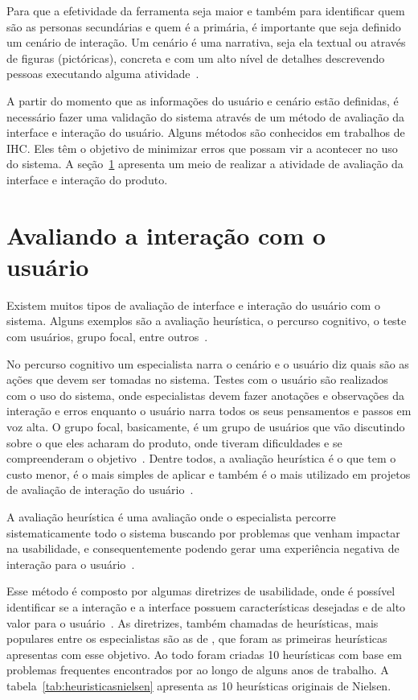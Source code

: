 Para que a efetividade da ferramenta seja maior e também para identificar quem são as personas secundárias e quem é a primária, é importante que seja definido um cenário de interação. Um cenário é uma narrativa, seja ela textual ou através de figuras (pictóricas), concreta e com um alto nível de detalhes descrevendo pessoas executando alguma atividade~\cite{barbosa:2010}.

A partir do momento que as informações do usuário e cenário estão definidas, é necessário fazer uma validação do sistema através de um método de avaliação da interface e interação do usuário. Alguns métodos são conhecidos em trabalhos de IHC. Eles têm o objetivo de minimizar erros que possam vir a acontecer no uso do sistema. A seção~\ref{sec:avaliacao} apresenta um meio de realizar a atividade de avaliação da interface e interação do produto.

\section{Avaliando a interação com o usuário}
\label{sec:avaliacao}
Existem muitos tipos de avaliação de interface e interação do usuário com o sistema. Alguns exemplos são a avaliação heurística, o percurso cognitivo, o teste com usuários, grupo focal, entre outros~\cite{barbosa:2010}.

No percurso cognitivo um especialista narra o cenário e o usuário diz quais são as ações que devem ser tomadas no sistema. Testes com o usuário são realizados com o uso do sistema, onde especialistas devem fazer anotações e observações da interação e erros enquanto o usuário narra todos os seus pensamentos e passos em voz alta. O grupo focal, basicamente, é um grupo de usuários que vão discutindo sobre o que eles acharam do produto, onde tiveram dificuldades e se compreenderam o objetivo~\cite{barbosa:2010}. Dentre todos, a avaliação heurística é o que tem o custo menor, é o mais simples de aplicar e também é o mais utilizado em projetos de avaliação de interação do usuário~\cite{tsui:2010}.

A avaliação heurística é uma avaliação onde o especialista percorre sistematicamente todo o sistema buscando por problemas que venham impactar na usabilidade, e consequentemente podendo gerar uma experiência negativa de interação para o usuário~\cite{barbosa:2010, benyon:2011}.

Esse método é composto por algumas diretrizes de usabilidade, onde é possível identificar se a interação e a interface possuem características desejadas e de alto valor para o usuário~\cite{barbosa:2010, benyon:2011}. As diretrizes, também chamadas de heurísticas, mais populares entre os especialistas são as de \textcite{nielsen:1994}, que foram as primeiras heurísticas apresentas com esse objetivo. Ao todo foram criadas 10 heurísticas com base em problemas frequentes encontrados por \textcite{nielsen:1994} ao longo de alguns anos de trabalho. A tabela~\ref{tab:heuristicasnielsen} apresenta as 10 heurísticas originais de Nielsen.

